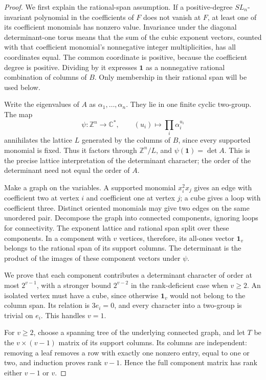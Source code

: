 \documentclass[11pt,a4paper]{article}
\begin{document}
\begin{proof}
We first explain the rational-span assumption. If a
positive-degree $SL_n$-invariant polynomial in the
coefficients of $F$ does not vanish at $F$, at least one of
its coefficient monomials has nonzero value. Invariance
under the diagonal determinant-one torus means that the
sum of the cubic exponent vectors, counted with that
coefficient monomial's nonnegative integer multiplicities,
has all coordinates equal. The common coordinate is
positive, because the coefficient degree is positive.
Dividing by it expresses $\mathbf1$ as a nonnegative
rational combination of columns of $B$. Only membership
in their rational span will be used below.

Write the eigenvalues of $A$ as $\alpha_1,\ldots,\alpha_n$.
They lie in one finite cyclic two-group. The map
\[
 \psi:\mathbb Z^n\longrightarrow\mathbb C^*,\qquad
 (u_i)\longmapsto\prod_i\alpha_i^{u_i}
 \tag{P-F27b}
\]
annihilates the lattice $L$ generated by the columns of $B$,
since every supported monomial is fixed. Thus it factors
through $\mathbb Z^n/L$, and
$\psi(\mathbf1)=\det A$. This is the precise lattice
interpretation of the determinant character; the order
of the determinant need not equal the order of $A$.

Make a graph on the variables. A supported monomial
$x_i^2x_j$ gives an edge with coefficient two at vertex
$i$ and coefficient one at vertex $j$; a cube gives a loop
with coefficient three. Distinct oriented monomials may
give two edges on the same unordered pair. Decompose the
graph into connected components, ignoring loops for
connectivity. The exponent lattice and rational span
split over these components. In a component with $v$
vertices, therefore, its all-ones vector $\mathbf1_v$
belongs to the rational span of its support columns.
The determinant is the product of the images of these
component vectors under $\psi$.

We prove that each component contributes a determinant
character of order at most $2^{v-1}$, with a stronger
bound $2^{v-2}$ in the rank-deficient case when $v\ge2$.
An isolated vertex must have a cube, since otherwise
$\mathbf1_v$ would not belong to the column span. Its
relation is $3e_i=0$, and every character into a two-group
is trivial on $e_i$. This handles $v=1$.

For $v\ge2$, choose a spanning tree of the underlying
connected graph, and let $T$ be the $v\times(v-1)$ matrix
of its support columns. Its columns are independent:
removing a leaf removes a row with exactly one nonzero
entry, equal to one or two, and induction proves rank
$v-1$. Hence the full component matrix has rank either
$v-1$ or $v$.


\end{proof}
\end{document}
